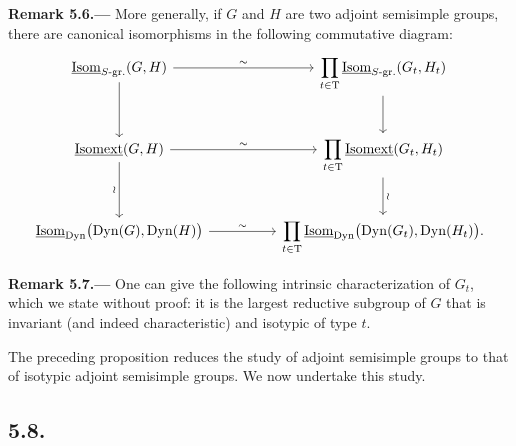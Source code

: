 \par\medskip\noindent{}\textbf{Remark 5.6.---}\enspace
More generally, if \(G\) and \(H\) are two adjoint semisimple groups,
there are canonical isomorphisms in the following commutative diagram:
\[
\begin{tikzcd}[column sep=huge,row sep=large]
\underline{\operatorname{Isom}}_{S\text{-}\mathrm{gr.}}(G,H)
  \arrow[r,"\sim"] \arrow[d]
&
\displaystyle\prod_{t\in\mathrm T}
\underline{\operatorname{Isom}}_{S\text{-}\mathrm{gr.}}(G_t,H_t)
  \arrow[d]
\\
\underline{\operatorname{Isomext}}(G,H)
  \arrow[r,"\sim"] \arrow[d,"\wr"']
&
\displaystyle\prod_{t\in\mathrm T}
\underline{\operatorname{Isomext}}(G_t,H_t)
  \arrow[d,"\wr"]
\\
\underline{\operatorname{Isom}}_{\mathrm{Dyn}}
  \bigl(\operatorname{Dyn}(G),\operatorname{Dyn}(H)\bigr)
  \arrow[r,"\sim"]
&
\displaystyle\prod_{t\in\mathrm T}
\underline{\operatorname{Isom}}_{\mathrm{Dyn}}
  \bigl(\operatorname{Dyn}(G_t),\operatorname{Dyn}(H_t)\bigr).
\end{tikzcd}


\]

\par\medskip\noindent{}\textbf{Remark 5.7.---}\enspace
One can give the following intrinsic characterization of \(G_t\),
which we state without proof: it is the largest reductive subgroup of
\(G\) that is invariant (and indeed characteristic) and isotypic of
type \(t\).

The preceding proposition reduces the study of adjoint semisimple
groups to that of isotypic adjoint semisimple groups.  We now undertake
this study.

\subsection*{5.8.}

